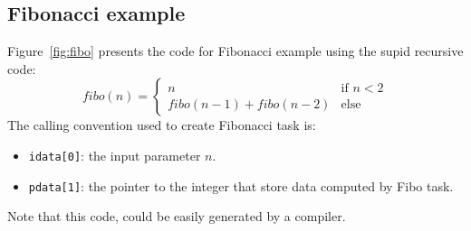 \documentclass[12pt]{report}
\begin{document}
\subsection{Fibonacci example}

Figure~\ref{fig:fibo} presents the code for Fibonacci example using the supid recursive code:
$$
fibo(n) = 
\left\{
\begin{array}{ll}
n & \mbox{if } n<2\\
fibo(n-1)+fibo(n-2) & \mbox{else}
\end{array}
\right.
$$
The calling convention used to create Fibonacci task is:
\begin{itemize}
\item \verb+idata[0]+: the input parameter $n$.
\item \verb+pdata[1]+: the pointer to the integer that store data computed by Fibo task.
\end{itemize}
Note that this code, could be easily generated by a compiler.
\end{document}
